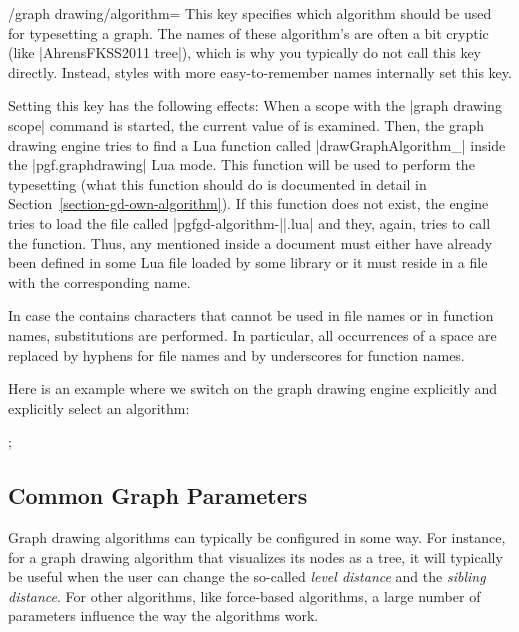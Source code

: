 \begin{key}{/graph drawing/algorithm=}
  This key specifies which algorithm should be used for typesetting a
  graph. The names of these algorithm's are often a bit cryptic (like
  |AhrensFKSS2011 tree|), which is why you typically do not call this
  key directly. Instead, styles with more easy-to-remember names
  internally set this key.

  Setting this key has the following effects: When a scope with the
  |graph drawing scope| command is started, the current value of
   is examined. Then, the graph drawing engine
  tries to find a Lua function called
  |drawGraphAlgorithm_| inside the
  |pgf.graphdrawing| Lua mode. This function will be used to
  perform the typesetting (what this function should do is documented
  in detail in Section~\ref{section-gd-own-algorithm}). If this
  function does not exist, the engine tries to load the file 
  called |pgfgd-algorithm-||.lua| and they,
  again, tries to call the function. Thus, any 
  mentioned inside a document must either have already been defined in
  some Lua file loaded by some library or it must reside in a file
  with the corresponding name.
  
  In case the  contains characters that cannot
  be used in file names or in function names, substitutions are
  performed. In particular, all occurrences of a space are replaced by
  hyphens for file names and by underscores for function names.

  Here is an example where we switch on the graph drawing engine
  explicitly and explicitly select an algorithm:
\begin{codeexample}[]
\tikz [graph drawing scope,
       /graph drawing/algorithm=AhrensFKSS2011 tree]
  ;  
\end{codeexample}
\end{key}


\subsection{Common Graph Parameters}

Graph drawing algorithms can typically be configured in some way. For
instance, for a graph drawing algorithm that visualizes its nodes as a
tree, it will typically be useful when the user can change the
so-called \emph{level distance} and the \emph{sibling distance}. For
other algorithms, like force-based algorithms, a large number of
parameters influence the way the algorithms work.

